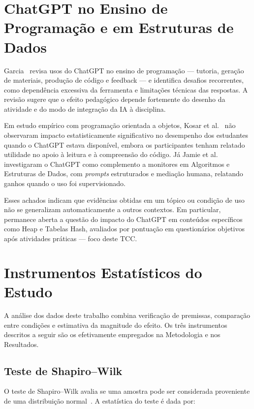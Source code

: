 \section{ChatGPT no Ensino de Programação e em Estruturas de Dados}
\label{sec:chatgpt-dsa}

Garcia~\cite{garcia2025programming} revisa usos do ChatGPT no ensino de programação --- tutoria, geração de materiais, produção de código e feedback --- e identifica desafios recorrentes, como dependência excessiva da ferramenta e limitações técnicas das respostas. A revisão sugere que o efeito pedagógico depende fortemente do desenho da atividade e do modo de integração da IA à disciplina.

Em estudo empírico com programação orientada a objetos, Kosar et al.~\cite{kosar2024chatgpt} não observaram impacto estatisticamente significativo no desempenho dos estudantes quando o ChatGPT estava disponível, embora os participantes tenham relatado utilidade no apoio à leitura e à compreensão do código. Já Jamie et al.~\cite{jamie2024dsa} investigaram o ChatGPT como complemento a monitores em Algoritmos e Estruturas de Dados, com \textit{prompts} estruturados e mediação humana, relatando ganhos quando o uso foi supervisionado.

Esses achados indicam que evidências obtidas em um tópico ou condição de uso não se generalizam automaticamente a outros contextos. Em particular, permanece aberta a questão do impacto do ChatGPT em conteúdos específicos como Heap e Tabelas Hash, avaliados por pontuação em questionários objetivos após atividades práticas --- foco deste TCC.

\section{Instrumentos Estatísticos do Estudo}
\label{sec:testes-estatisticos}

A análise dos dados deste trabalho combina verificação de premissas, comparação entre condições e estimativa da magnitude do efeito. Os três instrumentos descritos a seguir são os efetivamente empregados na Metodologia e nos Resultados.

\subsection{Teste de Shapiro--Wilk}

O teste de Shapiro--Wilk avalia se uma amostra pode ser considerada proveniente de uma distribuição normal~\cite{sheskin2003handbook}. A estatística do teste é dada por:

